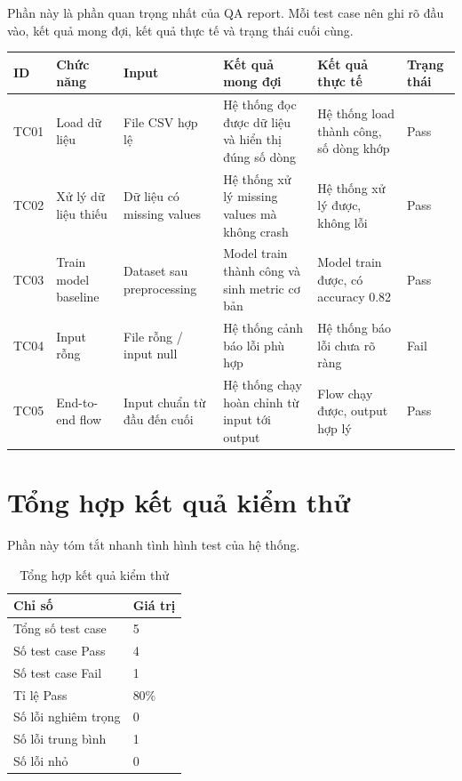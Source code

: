 \documentclass[12pt]{ai_conquer2026}
\begin{document}
Phần này là phần quan trọng nhất của QA report. Mỗi test case nên ghi rõ đầu vào, kết quả mong đợi, kết quả thực tế và trạng thái cuối cùng.

\renewcommand{\arraystretch}{1.3}

\begin{longtable}{|p{1.3cm}|p{2.5cm}|p{2.8cm}|p{3.2cm}|p{3.2cm}|p{1.5cm}|}
\hline
\textbf{ID} & \textbf{Chức năng} & \textbf{Input} & \textbf{Kết quả mong đợi} & \textbf{Kết quả thực tế} & \textbf{Trạng thái} \\
\hline
TC01 & Load dữ liệu & File CSV hợp lệ & Hệ thống đọc được dữ liệu và hiển thị đúng số dòng & Hệ thống load thành công, số dòng khớp & Pass \\
\hline
TC02 & Xử lý dữ liệu thiếu & Dữ liệu có missing values & Hệ thống xử lý missing values mà không crash & Hệ thống xử lý được, không lỗi & Pass \\
\hline
TC03 & Train model baseline & Dataset sau preprocessing & Model train thành công và sinh metric cơ bản & Model train được, có accuracy 0.82 & Pass \\
\hline
TC04 & Input rỗng & File rỗng / input null & Hệ thống cảnh báo lỗi phù hợp & Hệ thống báo lỗi chưa rõ ràng & Fail \\
\hline
TC05 & End-to-end flow & Input chuẩn từ đầu đến cuối & Hệ thống chạy hoàn chỉnh từ input tới output & Flow chạy được, output hợp lý & Pass \\
\hline
\end{longtable}

\section{Tổng hợp kết quả kiểm thử}

Phần này tóm tắt nhanh tình hình test của hệ thống.

\begin{table}[h!]
\centering
\renewcommand{\arraystretch}{1.3}
\begin{tabular}{|p{5cm}|p{3cm}|}
\hline
\textbf{Chỉ số} & \textbf{Giá trị} \\
\hline
Tổng số test case & 5 \\
\hline
Số test case Pass & 4 \\
\hline
Số test case Fail & 1 \\
\hline
Tỉ lệ Pass & 80\% \\
\hline
Số lỗi nghiêm trọng & 0 \\
\hline
Số lỗi trung bình & 1 \\
\hline
Số lỗi nhỏ & 0 \\
\hline
\end{tabular}
\caption{Tổng hợp kết quả kiểm thử}
\end{table}
\end{document}
